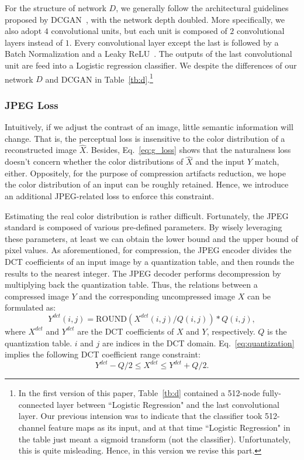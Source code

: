 \documentclass[10pt,twocolumn,letterpaper]{article}
\begin{document}
For the structure of network $D$, we generally follow the architectural guidelines proposed by DCGAN~\cite{dcgan}, with the network depth doubled. More specifically, we also adopt $4$ convolutional units, but each unit is composed of $2$ convolutional layers instead of $1$. Every convolutional layer except the last is followed by a Batch Normalization and a Leaky ReLU~\cite{lrelu}. The outputs of the last convolutional unit are feed into a Logistic regression classifier. We despite the differences of our network $D$ and DCGAN in Table~\ref{tb:d}.\footnote{In the first version of this paper, Table~\ref{tb:d} contained a 512-node fully-connected layer between ``Logistic Regression" and the last convolutional layer. Our previous intension was to indicate that the classifier took 512-channel feature maps as its input, and at that time ``Logistic Regression" in the table just meant a sigmoid transform (not the classifier). Unfortunately, this is quite misleading. Hence, in this version we revise this part.}

\subsubsection{JPEG Loss}
Intuitively, if we adjust the contrast of an image, little semantic information will change. That is, the perceptual loss is insensitive to the color distribution of a reconstructed image $\hat{X}$. Besides, Eq.~\eqref{eq:g_loss} shows that the naturalness loss doesn't concern whether the color distributions of $\hat{X}$ and the input $Y$ match, either. Oppositely, for the purpose of compression artifacts reduction, we hope the color distribution of an input can be roughly retained. Hence, we introduce an additional JPEG-related loss to enforce this constraint.

Estimating the real color distribution is rather difficult. Fortunately, the JPEG standard is composed of various pre-defined parameters. By wisely leveraging these parameters, at least we can obtain the lower bound and the upper bound of pixel values. As aforementioned, for compression, the JPEG encoder divides the DCT coefficients of an input image by a quantization table, and then rounds the results to the nearest integer. The JPEG decoder performs decompression by multiplying back the quantization table. Thus, the relations between a compressed image $Y$ and the corresponding uncompressed image $X$ can be formulated as:
\begin{equation}
Y^{dct}(i, j) = \text{ROUND}\left(X^{dct}(i, j) / Q(i, j)\right) * Q(i, j),
\label{eq:quantization}
\end{equation}
where $X^{dct}$ and $Y^{dct}$ are the DCT coefficients of $X$ and $Y$, respectively. $Q$ is the quantization table. $i$ and $j$ are indices in the DCT domain. Eq.~\eqref{eq:quantization} implies the following DCT coefficient range constraint:
\begin{equation}
Y^{dct} - Q / 2 \le X^{dct} \le Y^{dct} + Q / 2.
\label{eq:constraint}
\end{equation}
\end{document}
